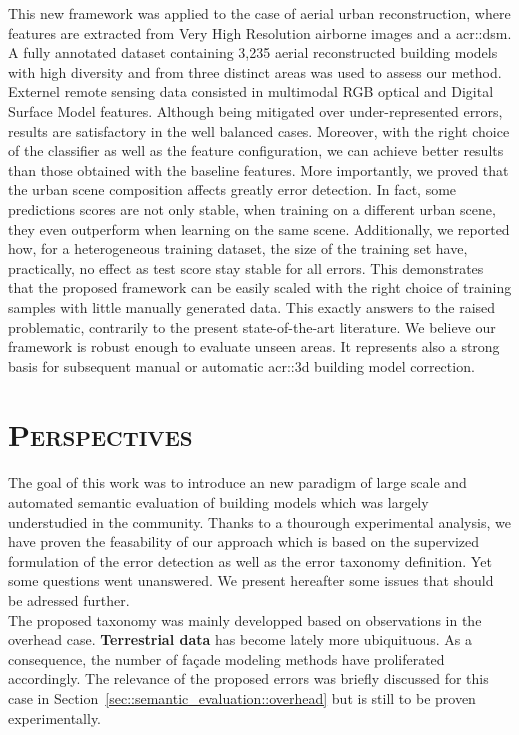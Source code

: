     This new framework was applied to the case of aerial urban reconstruction, where features are extracted from Very High Resolution airborne images and a \acrlong{acr::dsm}.
    A fully annotated dataset containing 3,235 aerial reconstructed building models with high diversity and from three distinct areas was used to assess our method.
    Externel remote sensing data consisted in multimodal RGB optical and Digital Surface Model features.
    Although being mitigated over under-represented errors, results are satisfactory in the well balanced cases.
    Moreover, with the right choice of the classifier as well as the feature configuration, we can achieve better results than those obtained with the baseline features.
    More importantly, we proved that the urban scene composition affects greatly error detection.
    In fact, some predictions scores are not only stable, when training on a different urban scene, they even outperform when learning on the same scene.
    Additionally, we reported how, for a heterogeneous training dataset, the size of the training set have, practically, no effect as test score stay stable for all errors.
    This demonstrates that the proposed framework can be easily scaled with the right choice of training samples with little manually generated data.
    This exactly answers to the raised problematic, contrarily to the present state-of-the-art literature.
    We believe our framework is robust enough to evaluate unseen areas.
    It represents also a strong basis for subsequent manual or automatic \gls{acr::3d} building model correction.

\section{\textsc{Perspectives}}
    \label{sec::conclusion::perspectives}
    The goal of this work was to introduce an new paradigm of large scale and automated semantic evaluation of building models which was largely understudied in the community.
    Thanks to a thourough experimental analysis, we have proven the feasability of our approach which is based on the supervized formulation of the error detection as well as the error taxonomy definition.
    Yet some questions went unanswered.
    We present hereafter some issues that should be adressed further.\\

    The proposed taxonomy was mainly developped based on observations in the overhead case.
    \textbf{Terrestrial data} has become lately more ubiquituous.
    As a consequence, the number of façade modeling methods have proliferated accordingly.
    The relevance of the proposed errors was briefly discussed for this case in Section~\ref{sec::semantic_evaluation::overhead} but is still to be proven experimentally.\\

